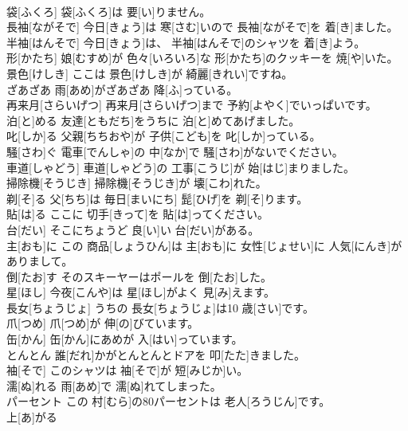 \documentclass[8pt]{extreport}
\begin{document}
\begin{CJK}{UTF8}{min}
\\	袋[ふくろ]	袋[ふくろ]は 要[い]りません。		
\\	長袖[ながそで]	今日[きょう]は 寒[さむ]いので 長袖[ながそで]を 着[き]ました。		
\\	半袖[はんそで]	今日[きょう]は、 半袖[はんそで]のシャツを 着[き]よう。		
\\	形[かたち]	娘[むすめ]が 色々[いろいろ]な 形[かたち]のクッキーを 焼[や]いた。		
\\	景色[けしき]	ここは 景色[けしき]が 綺麗[きれい]ですね。		
\\	ざあざあ	雨[あめ]がざあざあ 降[ふ]っている。		
\\	再来月[さらいげつ]	再来月[さらいげつ]まで 予約[よやく]でいっぱいです。		
\\	泊[と]める	友達[ともだち]をうちに 泊[と]めてあげました。		
\\	叱[しか]る	父親[ちちおや]が 子供[こども]を 叱[しか]っている。		
\\	騒[さわ]ぐ	電車[でんしゃ]の 中[なか]で 騒[さわ]がないでください。		
\\	車道[しゃどう]	車道[しゃどう]の 工事[こうじ]が 始[はじ]まりました。		
\\	掃除機[そうじき]	掃除機[そうじき]が 壊[こわ]れた。		
\\	剃[そ]る	父[ちち]は 毎日[まいにち] 髭[ひげ]を 剃[そ]ります。		
\\	貼[は]る	ここに 切手[きって]を 貼[は]ってください。		
\\	台[だい]	そこにちょうど 良[い]い 台[だい]がある。		
\\	主[おも]に	この 商品[しょうひん]は 主[おも]に 女性[じょせい]に 人気[にんき]がありまして。		
\\	倒[たお]す	そのスキーヤーはポールを 倒[たお]した。		
\\	星[ほし]	今夜[こんや]は 星[ほし]がよく 見[み]えます。		
\\	長女[ちょうじょ]	うちの 長女[ちょうじょ]は10 歳[さい]です。		
\\	爪[つめ]	爪[つめ]が 伸[の]びています。		
\\	缶[かん]	缶[かん]にあめが 入[はい]っています。		
\\	とんとん	誰[だれ]かがとんとんとドアを 叩[たた]きました。		
\\	袖[そで]	このシャツは 袖[そで]が 短[みじか]い。		
\\	濡[ぬ]れる	雨[あめ]で 濡[ぬ]れてしまった。		
\\	パーセント	この 村[むら]の80パーセントは 老人[ろうじん]です。		
\\	上[あ]がる 

\end{CJK}
\end{document}
